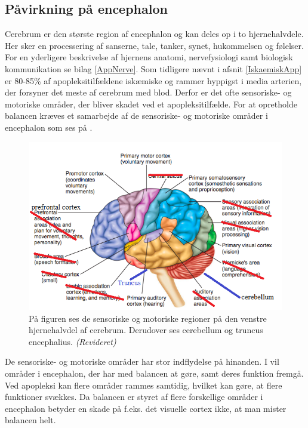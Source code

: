 \subsection{Påvirkning på encephalon}\label{HjerneSenMot}
Cerebrum er den største region af encephalon og kan deles op i to hjernehalvdele. Her sker en processering af sanserne, tale, tanker, synet, hukommelsen og følelser. \cite{Martini2012} For en yderligere beskrivelse af hjernens anatomi, nervefysiologi samt biologisk kommunikation se bilag \ref{AppNerve}. Som tidligere nævnt i afsnit \ref{IskaemiskApp} er 80-85\% af apopleksitilfældene iskæmiske og rammer hyppigst i media arterien, der forsyner det meste af cerebrum med blod. Derfor er det ofte sensoriske- og motoriske områder, der bliver skadet ved et apopleksitilfælde. \cite{Kruuse2015a,Gade2004,Boss2010} For at opretholde balancen kræves et samarbejde af de sensoriske- og motoriske områder i encephalon som ses på .

\begin{figure}[H]
	\centering
	\includegraphics[scale=0.6]{figures/bProblemanalyse/Encephalon2.png}
	\caption{På figuren ses de sensoriske og motoriske regioner på den venstre hjernehalvdel af cerebrum. Derudover ses cerebellum og truncus encephalius. \textit{(Revideret)} \cite{Stanfield2014}}
	\label{Enc}
\end{figure}

De sensoriske- og motoriske områder har stor indflydelse på hinanden. I  vil områder i encephalon, der har med balancen at gøre, samt deres funktion fremgå. Ved apopleksi kan flere områder rammes samtidig, hvilket kan gøre, at flere funktioner svækkes. Da balancen er styret af flere forskellige områder i encephalon betyder en skade på f.eks. det visuelle cortex ikke, at man mister balancen helt. 

